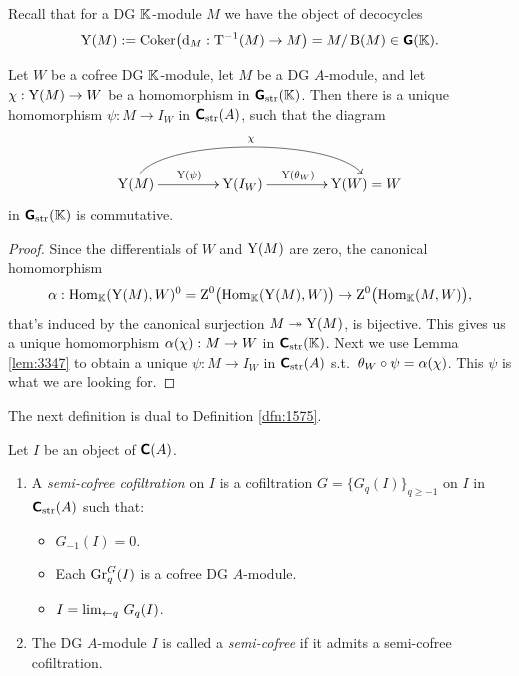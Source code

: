 Recall that for a DG $\mathbb{K}$-module $M$ we have the object of decocycles
\[ \operatorname{Y}(M) := \operatorname{Coker} \bigl( \mathrm{d}_M : \operatorname{T}^{-1}(M) \to M \bigr) =
M / \operatorname{B}(M) \in \boldsymbol{\mathsf{G}}(\mathbb{K}) . \]

\begin{lem} \label{lem:3348}
Let $W$ be a cofree DG $\mathbb{K}$-module, let $M$ be a DG $A$-module, and let 
$\chi : \operatorname{Y}(M) \to W$ be a homomorphism in $\boldsymbol{\mathsf{G}}_{\mathrm{str}}(\mathbb{K})$.
Then there is a unique homomorphism 
$\psi : M \to I_W$ in $\boldsymbol{\mathsf{C}}_{\mathrm{str}}(A)$, such that the diagram 
\[ \UseTips \xymatrix @C=10ex @R=6ex {
\opn{Y}(M)
\ar[r]^{\opn{Y}(\psi)}
\ar@(u,u)[rr]^{\chi}
&
\opn{Y}(I_W)
\ar[r]^(0.45){\opn{Y}(\th_W)}
&
\opn{Y}(W) = W
} \]
in $\boldsymbol{\mathsf{G}}_{\mathrm{str}}(\mathbb{K})$ is commutative. 
\end{lem}

\begin{proof}
Since the differentials of $W$ and $\operatorname{Y}(M)$ are zero, the canonical 
homomorphism 
\[ \alpha : \operatorname{Hom}_{\mathbb{K}}(\operatorname{Y}(M), W)^0 = 
\operatorname{Z}^0 \bigl( \operatorname{Hom}_{\mathbb{K}}(\operatorname{Y}(M), W) \bigr) \to 
\operatorname{Z}^0 \bigl( \operatorname{Hom}_{\mathbb{K}}(M, W) \bigr) , \]
that's induced by the canonical surjection 
$M \twoheadrightarrow \operatorname{Y}(M)$, is bijective. This gives us a unique homomorphism 
$\alpha(\chi) : M \to W$ in $\boldsymbol{\mathsf{C}}_{\mathrm{str}}(\mathbb{K})$. Next we use Lemma 
\ref{lem:3347} to obtain a unique 
$\psi : M \to I_W$ in $\boldsymbol{\mathsf{C}}_{\mathrm{str}}(A)$ s.t.\ 
$\theta_W \circ \psi = \alpha(\chi)$. This $\psi$ is what we are looking for. 
\end{proof}

The next definition is dual to Definition \ref{dfn:1575}. 

\begin{dfn} \label{dfn:1665}
Let $I$ be an object of $\boldsymbol{\mathsf{C}}(A)$.
\begin{enumerate}
\item A {\em semi-cofree cofiltration}%
on $I$ is a cofiltration
$G = \{ G_q(I) \}_{q \geq -1}$ on $I$ in $\boldsymbol{\mathsf{C}}_{\mathrm{str}}(A)$ such that:
\begin{itemize}
\item $G_{-1}(I) = 0$. 

\item Each $\operatorname{Gr}_q^G(I)$ is a cofree DG $A$-module.

\item $I = \lim_{\leftarrow q} \, G_q(I)$.
\end{itemize}

\item The DG $A$-module $I$ is called a {\em semi-cofree}%
if it admits a semi-cofree cofiltration. 
\end{enumerate}
\end{dfn}

